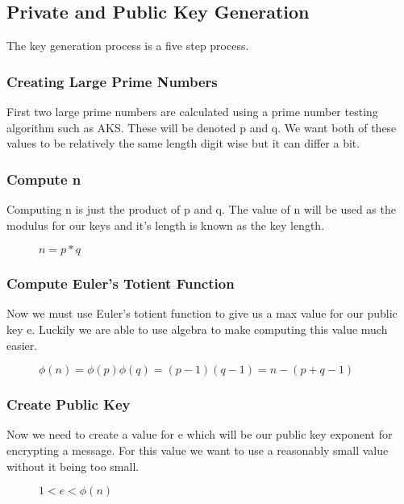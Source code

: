 \documentclass[conference]{IEEEtran}
\begin{document}
\subsection{Private and Public Key Generation}
The key generation process is a five step process.

\subsubsection{Creating Large Prime Numbers}
First two large prime numbers are calculated using a prime number testing algorithm such as AKS. These will be denoted p and q. We want both of these values to be relatively the same length digit wise but it can differ a bit.

\subsubsection{Compute n}
Computing n is just the product of p and q. The value of n will be used as the modulus for our keys and it's length is known as the key length.

\begin{figure}[h]
	\begin{center}
		$n=p * q$
	\end{center}
\end{figure}

\subsubsection{Compute Euler's Totient Function}
Now we must use Euler's totient function to give us a max value for our public key e.
Luckily we are able to use algebra to make computing this value much easier.
\begin{figure}[h]
	\begin{center}
		$\phi \left(n\right)=\phi \left(p\right)\phi \left(q\right)=\left(p-1\right)\left(q-1\right)=n-\left(p+q-1\right)$
	\end{center}
\end{figure}

\subsubsection{Create Public Key}
Now we need to create a value for e which will be our public key exponent for encrypting a message. For this value we want to use a reasonably small value without it being too small.
\begin{figure}[h]
	\begin{center}
		$1 < e < \phi \left(n\right)$
	\end{center}
\end{figure}
\end{document}

